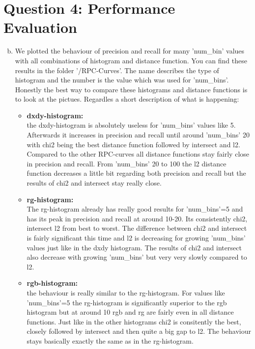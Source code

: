 \documentclass[12pt]{article}
\begin{document}
\newpage
\section*{Question 4: Performance Evaluation}

\begin{enumerate}[a)]
    \setcounter{enumi}{1}
    \item 
        We plotted the behaviour of precision and recall for many 'num\_bin' values with all combinations of histogram and distance function. You can find these results in the folder '/RPC-Curves'. The name describes the type of histogram and the number is the value which was used for 'num\_bins'. Honestly the best way to compare these histograms and distance functions is to look at the pictues. Regardles a short description of what is happening:
        \begin{itemize}
            \item 
                \textbf{dxdy-histogram:}\\
                the dxdy-histogram is absolutely useless for 'num\_bins' values like 5. Afterwards it increases in precision and recall until around 'num\_bins' 20 with chi2 being the best distance function followed by intersect and l2. Compared to the other RPC-curves all distance functions stay fairly close in precision and recall. From 'num\_bins' 20 to 100 the l2 distance function decreases a little bit regarding both precision and recall but the results of chi2 and intersect stay really close.
            \item 
                \textbf{rg-histogram:}\\
                The rg-histogram already has really good results for 'num\_bins'=5 and has its peak in precision and recall at around 10-20. Its consistently chi2, intersect l2 from best to worst. The difference between chi2 and intersect is fairly significant this time and l2 is decreasing for growing 'num\_bins' values just like in the dxdy histogram. The results of chi2 and intersect also decrease with growing 'num\_bins' but very very slowly compared to l2.
            \item 
                \textbf{rgb-histogram:}\\
                the behaviour is really similar to the rg-histogram. For values like 'num\_bins'=5 the rg-histogram is significantly superior to the rgb histogram but at around 10 rgb and rg are fairly even in all distance functions. Just like in the other histograms chi2 is consitently the best, closely followed by intersect and then quite a big gap to l2. The behaviour stays basically exactly the same as in the rg-histogram.


\end{itemize}
\end{enumerate}
\end{document}
